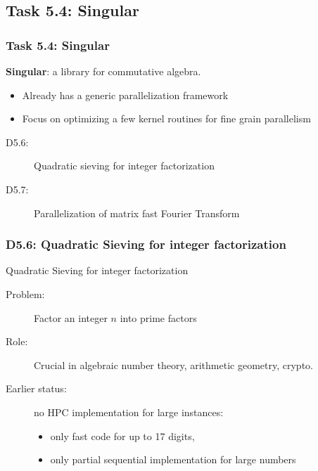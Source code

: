 \documentclass{beamer}
\begin{document}
\subsection{Task 5.4: Singular}
\begin{frame}
  \frametitle{Task 5.4: Singular}
\begin{center}{\Large
  \textbf{Singular}: a library for commutative algebra.}
\end{center}

  \begin{itemize}
  \item Already has a generic parallelization framework
  \item Focus on optimizing a few kernel routines for fine grain parallelism
  \end{itemize}

  \begin{description}
  \item[D5.6:] Quadratic sieving for integer factorization
  \item[D5.7:] Parallelization of matrix fast Fourier Transform
  \end{description}
\end{frame}
\begin{frame}
  \frametitle{D5.6: Quadratic Sieving for integer factorization}

  \begin{block}{Quadratic Sieving for integer factorization}
    \begin{description}
    \item[Problem:]  Factor an integer $n$ into prime factors
    \item[Role:] Crucial in algebraic number theory, arithmetic geometry, crypto.
    \item [Earlier status:] no HPC implementation for large instances:
      \begin{itemize}
      \item only fast code for up to 17 digits,
      \item only partial sequential implementation for large numbers
      \end{itemize}
    \end{description}
    \end{block}
\end{frame}
\end{document}
